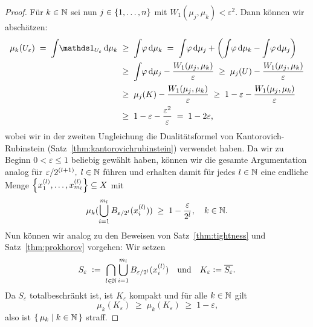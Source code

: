 \documentclass[../main/main.tex]{subfiles}
\begin{document}
\begin{proof}
		Für  $k \in \mathbb{N}$ sei nun $j \in \left\{1, \dots, n\right\}$ mit $W_1(\mu_j, \mu_k) < \varepsilon^2$. Dann können wir abschätzen:
		\begin{align*}
			\mu_k(U_\varepsilon) \; = \; \measureint{}{\indfct_{U_\varepsilon}}{\mu_k} \; &\geq \; \measureint{}{\varphi}{\mu_k} \; = \; \measureint{}{\varphi}{\mu_j} + \left( \measureint{}{\varphi}{\mu_k} - \measureint{}{\varphi}{\mu_j} \right) \\
			                                                                              &\geq \; \measureint{}{\varphi}{\mu_j} - \frac{W_1(\mu_j, \mu_k)}{\varepsilon} \; \geq \; \mu_j(U) - \frac{W_1(\mu_j, \mu_k)}{\varepsilon} \\
			                                                                              &\geq \; \mu_j(K) - \frac{W_1(\mu_j, \mu_k)}{\varepsilon} \; \geq \; 1 - \varepsilon - \frac{W_1(\mu_j, \mu_k)}{\varepsilon} \\
			                                                                              &\geq \; 1 - \varepsilon - \frac{\varepsilon^2}{\varepsilon} \; = \; 1 - 2\varepsilon \text{,}
		\end{align*}
		wobei wir in der zweiten Ungleichung die Dualitätsformel von Kantorovich-Rubinstein (Satz~\ref{thm:kantorovichrubinstein}) verwendet haben.
		Da wir zu Beginn $0 < \varepsilon \leq 1$ beliebig gewählt haben, können wir die gesamte Argumentation analog für $\varepsilon/2^{(l+1)}, \; l \in \mathbb{N}$ führen und erhalten damit für jedes $l \in \mathbb{N}$ 
		eine endliche Menge $\left\{x_1^{(l)}, \dots, x_{m_l}^{(l)}\right\} \subseteq X$ mit
		\[ \mu_k(\bigcup_{i=1}^{m_l} B_{\varepsilon/2^l}(x_i^{(l)})) \; \geq \; 1 - \frac{\varepsilon}{2^l}, \quad k \in \mathbb{N} \text{.} \]
		Nun können wir analog zu den Beweisen von Satz~\ref{thm:tightness} und Satz~\ref{thm:prokhorov} vorgehen:
		Wir setzen
		\[ S_{\varepsilon} \; \vcentcolon = \; \bigcap_{l \in \mathbb{N}} \bigcup_{i=1}^{m_l} B_{\varepsilon/2^l}(x_i^{(l)}) \quad \text{und} \quad K_{\varepsilon} \vcentcolon = \overline{S_\varepsilon} \text{.} \]
		Da $S_{\varepsilon}$ totalbeschränkt ist, ist $K_{\varepsilon}$ kompakt und für alle $k \in \mathbb{N}$ gilt
		\[ \mu_k(K_{\varepsilon}) \; \geq \; \mu_k(K_{\varepsilon}) \; \geq \; 1 - \varepsilon \text{,} \]
		also ist $\left\{\, \mu_k \; \middle| \; k \in \mathbb{N} \,\right\}$ straff.
	\end{proof}
\end{document}
